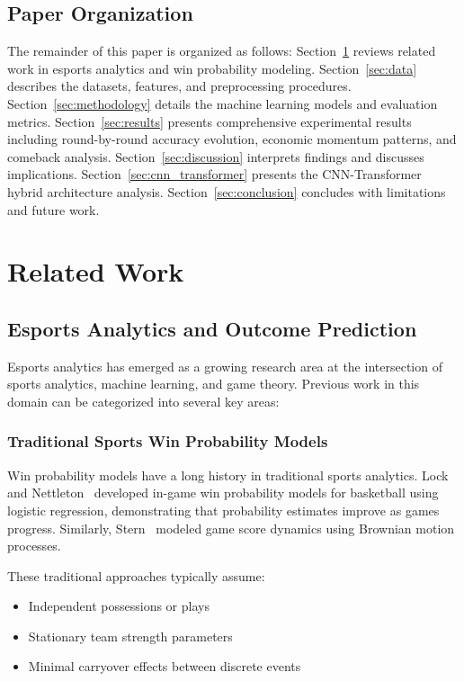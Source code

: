 \documentclass[11pt]{article}
\begin{document}
\subsection{Paper Organization}

The remainder of this paper is organized as follows: Section~\ref{sec:related} reviews related work in esports analytics and win probability modeling. Section~\ref{sec:data} describes the datasets, features, and preprocessing procedures. Section~\ref{sec:methodology} details the machine learning models and evaluation metrics. Section~\ref{sec:results} presents comprehensive experimental results including round-by-round accuracy evolution, economic momentum patterns, and comeback analysis. Section~\ref{sec:discussion} interprets findings and discusses implications. Section~\ref{sec:cnn_transformer} presents the CNN-Transformer hybrid architecture analysis. Section~\ref{sec:conclusion} concludes with limitations and future work.

\section{Related Work}
\label{sec:related}

\subsection{Esports Analytics and Outcome Prediction}

Esports analytics has emerged as a growing research area at the intersection of sports analytics, machine learning, and game theory. Previous work in this domain can be categorized into several key areas:

\subsubsection{Traditional Sports Win Probability Models}

Win probability models have a long history in traditional sports analytics. Lock and Nettleton~\cite{lock2014} developed in-game win probability models for basketball using logistic regression, demonstrating that probability estimates improve as games progress. Similarly, Stern~\cite{stern1994} modeled game score dynamics using Brownian motion processes.

These traditional approaches typically assume:
\begin{itemize}
    \item Independent possessions or plays
    \item Stationary team strength parameters
    \item Minimal carryover effects between discrete events
\end{itemize}
\end{document}
